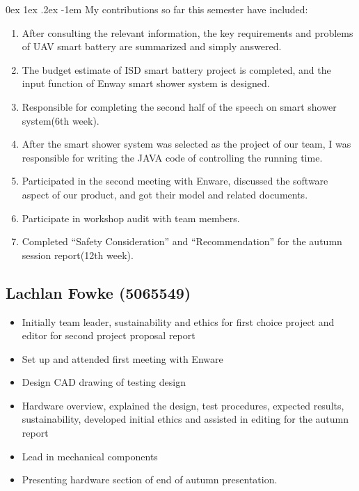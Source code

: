 \documentclass[12pt, a4paper]{article}
\makeatletter
\renewcommand\paragraph{\@startsection{paragraph}{5}{\parindent}%
  {0ex \@plus1ex \@minus.2ex}%
  {-1em}%
  {\normalfont\normalsize\bfseries}}
\makeatother
\begin{document}
                \paragraph{}
                    My contributions so far this semester have included:
                    \begin{enumerate}
                        \item After consulting the relevant information, the key requirements and problems of UAV smart battery are summarized and simply answered.
                        \item The budget estimate of ISD smart battery project is completed, and the input function of Enway smart shower system is designed.
                        \item Responsible for completing the second half of the speech on smart shower system(6th week).
                        \item After the smart shower system was selected as the project of our team, I was responsible for writing the JAVA code of controlling the running time.
                        \item Participated in the second meeting with Enware, discussed the software aspect of our product, and got their model and related documents.
                        \item Participate in workshop audit with team members.
                        \item Completed “Safety Consideration” and “Recommendation” for the autumn session report(12th week).
                    \end{enumerate}
            \subsection{Lachlan Fowke (5065549)}
                \begin{itemize}
                    \item Initially team leader, sustainability and ethics for first choice project and editor for second project proposal report
                    \item Set up and attended first meeting with Enware
                    \item Design CAD drawing of testing design
                    \item Hardware overview, explained the design, test procedures, expected results, sustainability, developed initial ethics and assisted in editing 
                        for the autumn report
                    \item Lead in mechanical components
                    \item Presenting hardware section of end of autumn presentation.
                \end{itemize}
\end{document}
